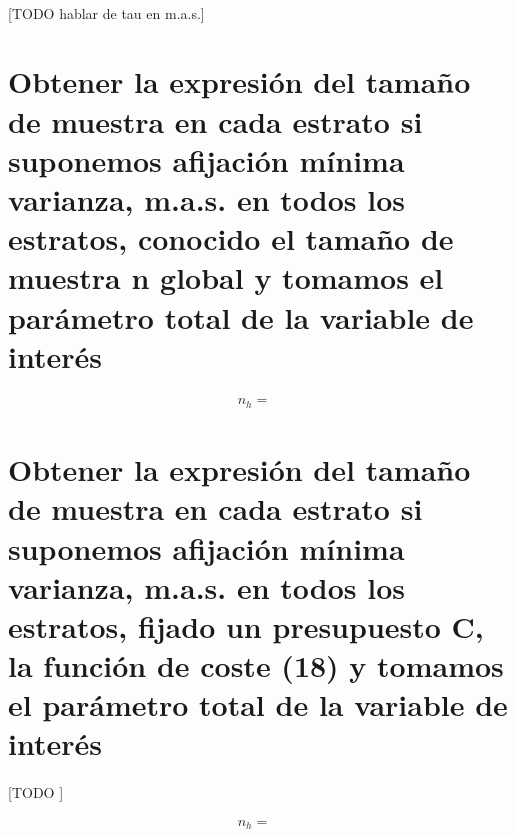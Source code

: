 \documentclass{article}
\begin{document}
    \paragraph{}
    [TODO hablar de tau en m.a.s.]


  \section{Obtener la expresión del tamaño de muestra en cada estrato si suponemos afijación mínima varianza,  m.a.s. en todos los estratos, conocido el tamaño de muestra n global y tomamos el parámetro total de la variable de interés}

    \paragraph{}


    \begin{align}
      n_h =&
    \end{align}

  \section{Obtener la expresión del tamaño de muestra en cada estrato si suponemos afijación mínima varianza,  m.a.s. en todos los estratos, fijado un presupuesto C, la función de coste (18)  y tomamos el parámetro total de la variable de interés}

    \paragraph{}
    [TODO ]

    \begin{align}
      n_h =&
    \end{align}



  \nocite{muest2017}
  \nocite{sarndal2003model}

  
  
\end{document}
